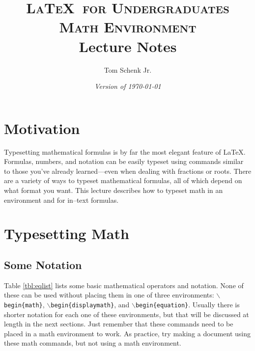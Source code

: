 \documentclass{article}
\title{\textsc{\LaTeX\ for Undergraduates\\
			Math Environment} \\
			Lecture Notes}
\author{Tom Schenk Jr.}
\date{\textit{Version of \today}}
\begin{document}
\maketitle

\section{Motivation}

Typesetting mathematical formulas is by far the most elegant feature of \LaTeX. Formulas, numbers, and notation can be easily typeset using commands similar to those you've already learned---even when dealing with fractions or roots. There are a variety of ways to typeset mathematical formulas, all of which depend on what format you want. This lecture describes how to typeset math in an environment and for in--text formulas.

\section{Typesetting Math}

\subsection{Some Notation}

Table \ref{tbl:eqlist} lists some basic mathematical operators and notation. None of these can be used without placing them in one of three environments: \texttt{$\backslash$begin\{math\}}, \texttt{$\backslash$begin\{displaymath\}}, and \texttt{$\backslash$begin\{equation\}}. Usually there is shorter notation for each one of these environments, but that will be discussed at length in the next sections. Just remember that these commands need to be placed in a math environment to work. As practice, try making a document using these math commands, but not using a math environment.
\end{document}
